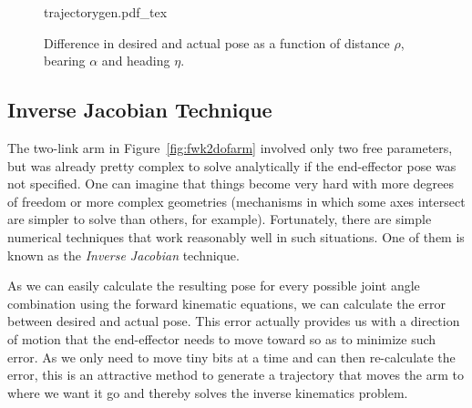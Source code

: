 \begin{figure}
    \centering
    \def\svgwidth{\textwidth}
    {trajectorygen.pdf_tex}
    \caption{Difference in desired and actual pose as a function of distance $\rho$, bearing $\alpha$ and heading $\eta$.}
    \label{fig:trajectorygen}
\end{figure}


\subsection{Inverse Jacobian Technique}\label{sec:invjac}

The two-link arm in Figure~\ref{fig:fwk2dofarm} involved only two free parameters, but was already pretty complex to solve analytically if the end-effector pose was not specified.
One can imagine that things become very hard with more degrees of freedom or more complex geometries (mechanisms in which some axes intersect are simpler to solve than others, for example).
Fortunately, there are simple numerical techniques that work reasonably well in such situations.
One of them is known as the \emph{Inverse Jacobian} technique.

As we can easily calculate the resulting pose for every possible joint angle combination using the forward kinematic equations, we can calculate the error between desired and actual pose.
This error actually provides us with a direction of motion that the end-effector needs to move toward so as to minimize such error.
As we only need to move tiny bits at a time and can then re-calculate the error, this is an attractive method to generate a trajectory that moves the arm to where we want it go and thereby solves the inverse kinematics problem.

